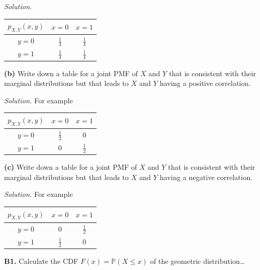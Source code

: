 \documentclass[
  a4paper,
]{book}
\theoremstyle{definition}
\theoremstyle{definition}
\theoremstyle{definition}
\theoremstyle{definition}
\theoremstyle{remark}
\begin{document}
\begin{myanswers}

\emph{Solution.}

\begin{longtable}[]{@{}ccc@{}}
\toprule
\(p_{X,Y}(x,y)\) & \(x = 0\) & \(x = 1\) \\
\midrule
\endhead
\(y = 0\) & \(\frac14\) & \(\frac14\) \\
\(y = 1\) & \(\frac14\) & \(\frac14\) \\
\bottomrule
\end{longtable}

\end{myanswers}

\textbf{(b)} Write down a table for a joint PMF of \(X\) and \(Y\) that is consistent with their marginal distributions but that leads to \(X\) and \(Y\) having a positive correlation.

\begin{myanswers}

\emph{Solution.} For example

\begin{longtable}[]{@{}ccc@{}}
\toprule
\(p_{X,Y}(x,y)\) & \(x = 0\) & \(x = 1\) \\
\midrule
\endhead
\(y = 0\) & \(\frac12\) & \(0\) \\
\(y = 1\) & \(0\) & \(\frac12\) \\
\bottomrule
\end{longtable}

\end{myanswers}

\textbf{(c)} Write down a table for a joint PMF of \(X\) and \(Y\) that is consistent with their marginal distributions but that leads to \(X\) and \(Y\) having a negative correlation.

\begin{myanswers}

\emph{Solution.} For example

\begin{longtable}[]{@{}ccc@{}}
\toprule
\(p_{X,Y}(x,y)\) & \(x = 0\) & \(x = 1\) \\
\midrule
\endhead
\(y = 0\) & \(0\) & \(\frac12\) \\
\(y = 1\) & \(\frac12\) & \(0\) \\
\bottomrule
\end{longtable}

\end{myanswers}

\textbf{B1.} Calculate the CDF \(F(x) = \mathbb P(X \leq x)\) of the geometric distribution\ldots{}
\end{document}
